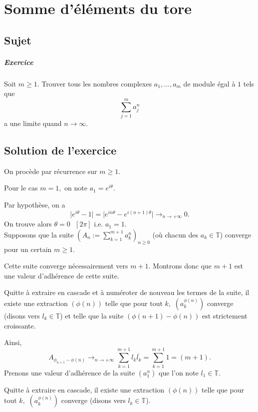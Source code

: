 \chapter{Somme d'éléments du tore}

\section{Sujet}

\paragraph{Exercice}
Soit $m \geqslant 1$. Trouver tous les nombres complexes $a_1,\dots,a_m$ de module égal à $1$ tels que
\[
\sum_{j=1}^m a_j^n
\]
a une limite quand $n \to \infty$.


\section{Solution de l'exercice}

On procède par récurrence sur $m\geq 1.$
 
Pour le cas $m=1,$ on note $a_{1}=e^{i\theta}.$

Par hypothèse, on a $$\vert e^{i\theta}-1\vert =\vert e^{in\theta}-e^{i(n+1)\theta}\vert \longrightarrow_{n\rightarrow +\infty} 0.$$ On trouve alors $\theta=0\mbox{ }[2\pi]$ i.e. $a_{1}=1.$\\


Supposons que la suite $\displaystyle\left(A_{n}:=\sum_{k=1}^{m+1}a_{k}^{n}\right)_{n\geq 0}$ (où chacun des $a_{k}\in\mathbb{T}$) converge pour un certain $m\geq 1.$

Cette suite converge nécessairement vers $m+1.$ Montrons donc que $m+1$ est une valeur d'adhérence de cette suite.

Quitte à extraire en cascade et à numéroter de nouveau les termes de la suite, il existe une extraction $(\phi(n))$ telle que pour tout $k,$ $(a_{k}^{\phi(n)})$ converge (disons vers $l_{k}\in\mathbb{T}$) et telle que la suite $(\phi(n+1)-\phi(n))$ est strictement croissante.

Ainsi, $$A_{\phi_{n+1}-\phi(n)}\longrightarrow_{n\rightarrow +\infty} \sum_{k=1}^{m+1}l_{k}\overline{l_{k}}=\sum_{k=1}^{m+1}1=(m+1).$$ 
Prenons une valeur d'adhérence de la suite $(a_{1}^{n})$ que l'on note $l_{1}\in\mathbb{T}.$

Quitte à extraire en cascade, il existe une extraction $(\phi(n))$ telle que pour tout $k,$ $(a_{k}^{\phi(n)})$ converge (disons vers $l_{k}\in\mathbb{T}$).

